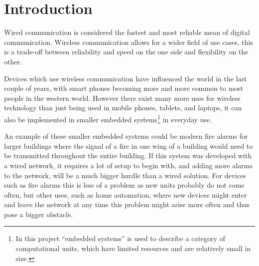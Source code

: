 \chapter{Introduction}
\vspace{-20pt}
Wired communication is considered the fastest and  most reliable mean of digital communication.
Wireless communication allows for a wider field of use cases, this is a trade-off between reliability and speed on the one side and flexibility on the other. \cite{wirelessTradeoffs}

Devices which use wireless communication have influenced the world in the last couple of years, with smart phones becoming more and more common to most people in the western world. \cite{2013-SmartPhoneUse}
However there exist many more uses for wireless technology than just being used in mobile phones, tablets, and laptops, it can also be implemented in smaller embedded systems\footnote{In this project \enquote{embedded systems} is used to describe a category of computational units, which have limited resources and are relatively small in size. } in everyday use.



An example of these smaller embedded systems could be modern fire alarms for larger buildings where the signal of a fire in one wing of a building would need to be transmitted throughout the entire building.
If this system was developed with a wired network, it requires a lot of setup to begin with, and adding more alarms to the network, will be a much bigger hurdle than a wired solution. 
For devices such as fire alarms this is less of a problem as new units probably do not come often, but other uses, such as home automation, where new devices might enter and leave the network at any time this problem might arise more often and thus pose a bigger obstacle.

